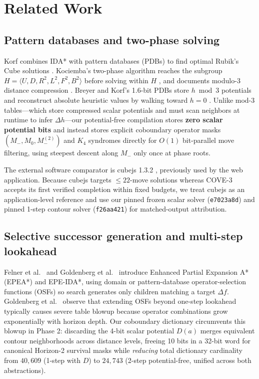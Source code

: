 \documentclass[10pt,twocolumn,letterpaper]{article}
\begin{document}
\hypertarget{related-work}{%
\section{Related Work}\label{related-work}}

\hypertarget{pattern-databases-and-two-phase-solving}{%
\subsection{Pattern databases and two-phase solving}\label{pattern-databases-and-two-phase-solving}}

Korf combines IDA* with pattern databases (PDBs) to find optimal Rubik's
Cube solutions \cite{korf1997}. Kociemba's two-phase algorithm reaches
the subgroup \(H=\langle U,D,R^2,L^2,F^2,B^2\rangle\) before solving
within \(H\) \cite{kociemba_coordinates}, and documents modulo-3
distance compression \cite{kociemba_pruning}. Breyer and Korf's 1.6-bit
PDBs store \(h \bmod 3\) potentials and reconstruct absolute heuristic
values by walking toward \(h=0\) \cite{breyer2010}. Unlike mod-3
tables---which store compressed scalar potentials and must scan
neighbors at runtime to infer \(\Delta h\)---our potential-free
compilation stores \textbf{zero scalar potential bits} and instead
stores explicit coboundary operator masks \((M_-, M_0, M_-^{(2)})\) and
\(K_4\) syndromes directly for \(O(1)\) bit-parallel move filtering,
using steepest descent along \(M_-\) only once at phase roots.

The external software comparator is cubejs 1.3.2 \cite{cubejs},
previously used by the web application. Because cubejs targets
\(\le 22\)-move solutions whereas COVE-3 accepts its first verified
completion within fixed budgets, we treat cubejs as an application-level
reference and use our pinned frozen scalar solver (\texttt{e7023a8d})
and pinned 1-step contour solver (\texttt{f26aa421}) for matched-output
attribution.

\hypertarget{selective-successor-generation-and-multi-step-lookahead}{%
\subsection{Selective successor generation and multi-step lookahead}\label{selective-successor-generation-and-multi-step-lookahead}}

Felner et al.~\cite{felner2012} and Goldenberg et
al.~\cite{goldenberg2014} introduce Enhanced Partial Expansion A*
(EPEA*) and EPE-IDA*, using domain or pattern-database
operator-selection functions (OSFs) so search generates only children
matching a target \(\Delta f\). Goldenberg et al.~\cite{goldenberg2014}
observe that extending OSFs beyond one-step lookahead typically causes
severe table blowup because operator combinations grow exponentially
with horizon depth. Our coboundary dictionary circumvents this blowup in
Phase 2: discarding the 4-bit scalar potential \(D(a)\) merges
equivalent contour neighborhoods across distance levels, freeing 10 bits
in a 32-bit word for canonical Horizon-2 survival masks while
\emph{reducing} total dictionary cardinality from \(40,609\) (1-step
with \(D\)) to \(24,743\) (2-step potential-free, unified across both
abstractions).
\end{document}
